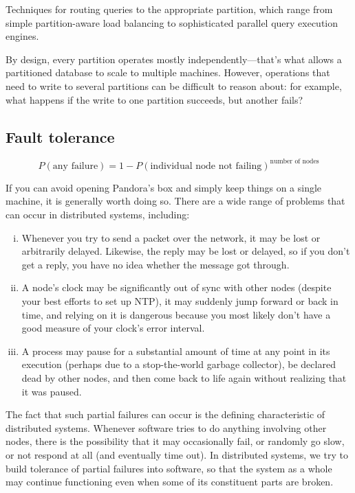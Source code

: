 \documentclass{article}
\begin{document}
    Techniques for routing queries to the appropriate partition, which range from simple partition-aware load balancing to sophisticated parallel query execution engines.
    
    By design, every partition operates mostly independently—that’s what allows a partitioned database to scale to multiple machines. However, operations that need to write to several partitions can be difficult to reason about: for example, what happens if the write to one partition succeeds, but another fails? 

    \subsection{Fault tolerance }
    
    \vspace{8pt}
    \[
        P(\text{any failure}) = 1- P(\text{individual node not failing})^{\text{number of nodes} } 
    \]
    
    If you can avoid opening Pandora’s box and simply keep things on a single machine, it is generally worth doing so. There are a wide range of problems that can occur in distributed systems, including:
    
    \begin{enumerate}[i.]
        \item Whenever you try to send a packet over the network, it may be lost or arbitrarily   delayed. Likewise, the reply may be lost or delayed, so if you don’t get a reply, you have no idea whether the message got through.
        \item A node’s clock may be significantly out of sync with other nodes (despite your   best efforts to set up NTP), it may suddenly jump forward or back in time, and relying on it is dangerous because you most likely don’t have a good measure of your clock’s error interval.
        \item A process may pause for a substantial amount of time at any point in its execution (perhaps due to a stop-the-world garbage collector), be declared dead by other nodes, and then come back to life again without realizing that it was paused.
    \end{enumerate}

    The fact that such partial failures can occur is the defining characteristic of distributed systems. Whenever software tries to do anything involving other nodes, there is the possibility that it may occasionally fail, or randomly go slow, or not respond at all (and eventually time out). In distributed systems, we try to build tolerance of partial failures into software, so that the system as a whole may continue functioning even when some of its constituent parts are broken.
    
\end{document}
